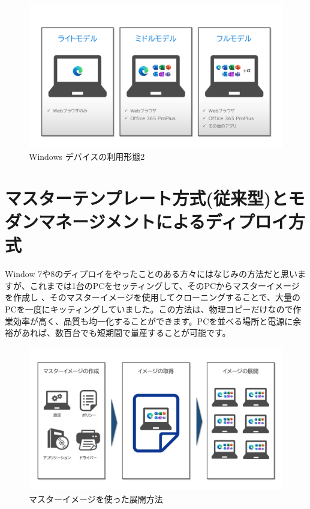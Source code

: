 \begin{figure}[htbp]
    \centering
    \includegraphics[width=12cm]{figures/HowtoUsePC-2.png}
    \caption{Windows デバイスの利用形態2}
    \label{fig:Windowデバイスの利用形態2}
\end{figure}

\section{マスターテンプレート方式(従来型)とモダンマネージメントによるディプロイ方式}

Window 7や8のディプロイをやったことのある方々にはなじみの方法だと思いますが、これまでは1台のPCをセッティングして、そのPCからマスターイメージを作成し
、そのマスターイメージを使用してクローニングすることで、大量のPCを一度にキッティングしていました。この方法は、物理コピーだけなので作業効率が高く、品質も均一化することができます。PCを並べる場所と電源に余裕があれば、数百台でも短期間で量産することが可能です。


\begin{figure}[htbp]
    \centering
    \includegraphics[width=12cm]{figures/MasterImage.png}
    \caption{マスターイメージを使った展開方法}
    \label{fig:MasterImage}
\end{figure}

